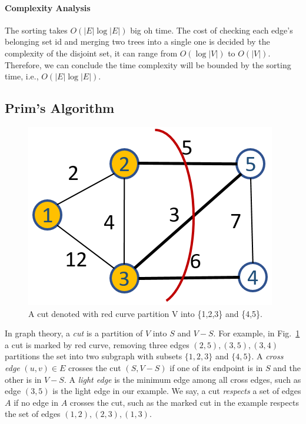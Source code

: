 \documentclass[../main.tex]{subfiles}
\begin{document}
\paragraph{Complexity Analysis} The sorting takes $O(|E|\log|E|)$ big oh time. The cost of checking each edge's belonging set id and merging two trees into a single one is decided by the complexity of the disjoint set, it can range from $O(\log|V|)$ to $O(|V|)$. Therefore, we can conclude the time complexity will be  bounded by the sorting time, i.e., $O(|E|\log|E|)$. 
  

 \subsection{Prim's Algorithm}
  \begin{figure}[!ht]
     \centering
     \includegraphics[width=0.45\columnwidth]{fig/graph_cut.png}
     \caption{A cut denoted with red curve partition V into \{1,2,3\} and \{4,5\}.}
     \label{fig:graph_cut}
 \end{figure}
  In graph theory, a \textit{cut} is a partition of $V$ into $S$ and $V-S$. For example, in Fig.~\ref{fig:graph_cut} a cut is marked by  red curve, removing three edges $(2, 5), (3, 5), (3, 4)$ partitions the set into two subgraph with subsets $\{1,2,3\}$ and $\{4,5\}$. A \textit{cross edge} $(u, v) \in E$ crosses the cut $(S, V-S)$ if  one of its endpoint is in $S$ and the other is in $V-S$. A \textit{light edge} is the minimum edge among all cross edges, such as edge $(3,5)$ is the light edge in our example. We say, a cut \textit{respects} a set of edges $A$ if no edge in $A$ crosses the cut, such as the marked cut in the example respects the set of edges $(1,2), (2, 3), (1, 3)$.
  
\end{document}
